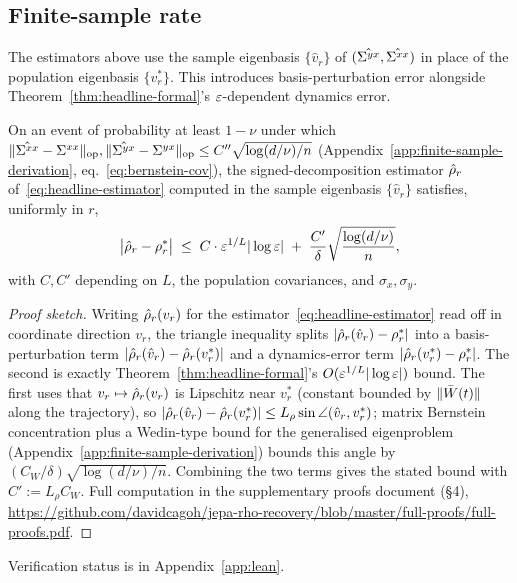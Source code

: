 \subsection{Finite-sample rate}
\label{sec:finite-sample}

The estimators above use the sample eigenbasis $\{\hat v_r\}$ of
$(\hat{\Sigma^{yx}}, \hat{\Sigma^{xx}})$ in place of the population eigenbasis
$\{v_r^*\}$. This introduces basis-perturbation error alongside
Theorem~\ref{thm:headline-formal}'s $\varepsilon$-dependent dynamics error.

\begin{corollary}
\label{cor:finite-sample-end}
On an event of probability at least $1-\nu$ under which
$\|\hat{\Sigma^{xx}}-\Sigma^{xx}\|_{\mathrm{op}}, \|\hat{\Sigma^{yx}}-\Sigma^{yx}\|_{\mathrm{op}} \le
C''\sqrt{\log(d/\nu)/n}$ (Appendix~\ref{app:finite-sample-derivation},
eq.~\eqref{eq:bernstein-cov}), the signed-decomposition estimator
$\hat{\rho}_r$ of~\eqref{eq:headline-estimator} computed in the sample
eigenbasis $\{\hat v_r\}$ satisfies, uniformly in $r$,
\[
\big|\hat{\rho}_r - \rho_r^*\big|
\;\le\;
C \cdot \varepsilon^{1/L} |\log\varepsilon|
\;+\;
\frac{C'}{\delta} \sqrt{\frac{\log(d/\nu)}{n}},
\]
with $C, C'$ depending on $L$, the population covariances, and
$\sigma_x, \sigma_y$.
\end{corollary}

\begin{proof}[Proof sketch]
Writing $\hat{\rho}_r(v_r)$ for the estimator~\eqref{eq:headline-estimator} read off in
coordinate direction $v_r$, the triangle inequality splits
$|\hat{\rho}_r(\hat v_r)-\rho_r^*|$ into a basis-perturbation term
$|\hat{\rho}_r(\hat v_r)-\hat{\rho}_r(v_r^*)|$ and a dynamics-error term
$|\hat{\rho}_r(v_r^*)-\rho_r^*|$. The second is exactly Theorem~\ref{thm:headline-formal}'s
$O(\varepsilon^{1/L}|\log\varepsilon|)$ bound. The first uses that $v_r\mapsto\hat{\rho}_r(v_r)$ is
Lipschitz near $v_r^*$ (constant bounded by $\|\bar{W}(t)\|$ along the trajectory), so
$|\hat{\rho}_r(\hat v_r)-\hat{\rho}_r(v_r^*)| \le L_\rho\sin\angle(\hat v_r,v_r^*)$; matrix
Bernstein concentration \citep[Thm~1.6.2]{Tropp2015} plus a Wedin-type bound for the
generalised eigenproblem (Appendix~\ref{app:finite-sample-derivation}) bounds this
angle by $(C_W/\delta)\sqrt{\log(d/\nu)/n}$. Combining the two terms gives the stated
bound with $C' := L_\rho C_W$. Full computation in the supplementary proofs document
(\S4), \url{https://github.com/davidcagoh/jepa-rho-recovery/blob/master/full-proofs/full-proofs.pdf}.
\end{proof}
Verification status is in Appendix~\ref{app:lean}.
